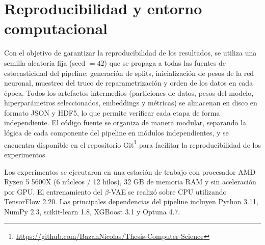 \section{Reproducibilidad y entorno computacional}
\label{sec:reproducibilidad}

Con el objetivo de garantizar la reproducibilidad de los resultados, se utiliza una semilla aleatoria fija (seed $= 42$) que se propaga a todas las fuentes de estocasticidad del pipeline: generación de splits, inicialización de pesos de la red neuronal, muestreo del truco de reparametrización y orden de los datos en cada época. Todos los artefactos intermedios (particiones de datos, pesos del modelo, hiperparámetros seleccionados, embeddings y métricas) se almacenan en disco en formato JSON y HDF5, lo que permite verificar cada etapa de forma independiente. El código fuente se organiza de manera modular, separando la lógica de cada componente del pipeline en módulos independientes, y se encuentra disponible en el repositorio Git\footnote{\url{https://github.com/BazanNicolas/Thesis-Computer-Science}} para facilitar la reproducibilidad de los experimentos.

Los experimentos se ejecutaron en una estación de trabajo con procesador AMD Ryzen 5 5600X (6 núcleos / 12 hilos), 32 GB de memoria RAM y sin aceleración por GPU. El entrenamiento del $\beta$-VAE se realizó sobre CPU utilizando TensorFlow 2.20. Las principales dependencias del pipeline incluyen Python 3.11, NumPy 2.3, scikit-learn 1.8, XGBoost 3.1 y Optuna 4.7.
